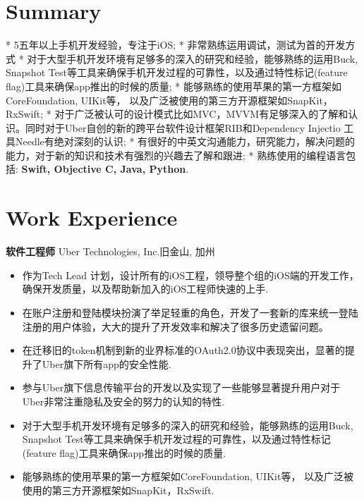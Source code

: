\documentclass[10pt,letterpaper,sans]{moderncv}        %
\begin{document}
\begin{CJK*}{UTF8}{gbsn}                          %
\makecvtitle



\vspace*{-1.3cm}
\section{Summary}
\cvitem{} {* 5五年以上手机开发经验，专注于iOS; }
\cvitem{} {* 非常熟练运用调试，测试为首的开发方式 }
\cvitem{} {* 对于大型手机开发环境有足够多的深入的研究和经验，能够熟练的运用Buck, Snapshot Test等工具来确保手机开发过程的可靠性，以及通过特性标记(feature flag)工具来确保app推出的时候的质量; }
\cvitem{} {* 能够熟练的使用苹果的第一方框架如CoreFoundation, UIKit等， 以及广泛被使用的第三方开源框架如SnapKit，RxSwift; }
\cvitem{} {* 对于广泛被认可的设计模式比如MVC，MVVM有足够深入的了解和认识。同时对于Uber自创的新的跨平台软件设计框架RIB和Dependency Injectio 工具Needle有绝对深刻的认识; }
\cvitem{} {* 有很好的中英文沟通能力，研究能力，解决问题的能力，对于新的知识和技术有强烈的兴趣去了解和跟进; }
\cvitem{} {* 熟练使用的编程语言包括: \textbf{Swift, Objective C, Java, Python}. }

\section{Work Experience}

{\textbf{软件工程师}}
{Uber Technologies, Inc.}{旧金山, 加州}{}{
\begin{itemize} 
\item 作为Tech Lead 计划，设计所有的iOS工程，领导整个组的iOS端的开发工作，确保开发质量，以及帮助新加入的iOS工程师快速的上手. 
\item 在账户注册和登陆模块扮演了举足轻重的角色，开发了一套新的库来统一登陆注册的用户体验，大大的提升了开发效率和解决了很多历史遗留问题。 
\item 在迁移旧的token机制到新的业界标准的OAuth2.0协议中表现突出，显著的提升了Uber旗下所有app的安全性能.
\item 参与Uber旗下信息传输平台的开发以及实现了一些能够显著提升用户对于Uber非常注重隐私及安全的努力的认知的特性.
\item 对于大型手机开发环境有足够多的深入的研究和经验，能够熟练的运用Buck, Snapshot Test等工具来确保手机开发过程的可靠性，以及通过特性标记(feature flag)工具来确保app推出的时候的质量. 
\item 能够熟练的使用苹果的第一方框架如CoreFoundation, UIKit等， 以及广泛被使用的第三方开源框架如SnapKit，RxSwift.
\end{itemize}} 


\end{CJK*}
\end{document}

